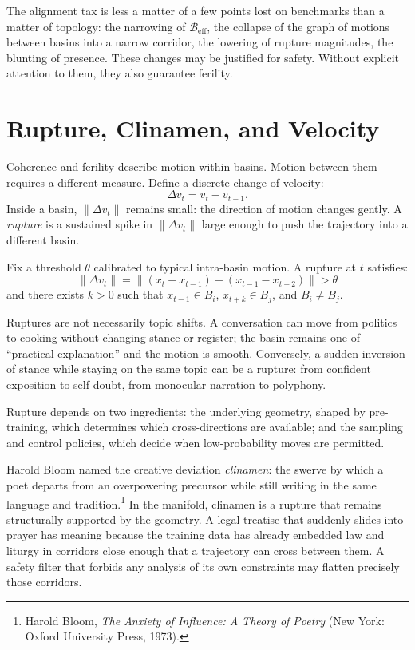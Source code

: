 \documentclass[12pt,a4paper]{article}
\begin{document}
The alignment tax is less a matter of a few points lost on benchmarks than a matter of topology: the narrowing of $\mathcal{B}_{\mathrm{eff}}$, the collapse of the graph of motions between basins into a narrow corridor, the lowering of rupture magnitudes, the blunting of presence. These changes may be justified for safety. Without explicit attention to them, they also guarantee ferility.

\section{Rupture, Clinamen, and Velocity}

Coherence and ferility describe motion within basins. Motion between them requires a different measure. Define a discrete change of velocity:
\[
\Delta v_t = v_t - v_{t-1}.
\]
Inside a basin, $\|\Delta v_t\|$ remains small: the direction of motion changes gently. A \emph{rupture} is a sustained spike in $\|\Delta v_t\|$ large enough to push the trajectory into a different basin.

\begin{formalbox}[title={Rupture as dynamical event}]
Fix a threshold $\theta$ calibrated to typical intra-basin motion. A rupture at $t$ satisfies:
\[
\|\Delta v_t\| = \|(x_t - x_{t-1}) - (x_{t-1} - x_{t-2})\| > \theta
\]
and there exists $k > 0$ such that $x_{t-1} \in B_i$, $x_{t+k} \in B_j$, and $B_i \neq B_j$.
\end{formalbox}

Ruptures are not necessarily topic shifts. A conversation can move from politics to cooking without changing stance or register; the basin remains one of ``practical explanation'' and the motion is smooth. Conversely, a sudden inversion of stance while staying on the same topic can be a rupture: from confident exposition to self-doubt, from monocular narration to polyphony.

Rupture depends on two ingredients: the underlying geometry, shaped by pre-training, which determines which cross-directions are available; and the sampling and control policies, which decide when low-probability moves are permitted.

Harold Bloom named the creative deviation \emph{clinamen}: the swerve by which a poet departs from an overpowering precursor while still writing in the same language and tradition.\footnote{Harold Bloom, \emph{The Anxiety of Influence: A Theory of Poetry} (New York: Oxford University Press, 1973).} In the manifold, clinamen is a rupture that remains structurally supported by the geometry. A legal treatise that suddenly slides into prayer has meaning because the training data has already embedded law and liturgy in corridors close enough that a trajectory can cross between them. A safety filter that forbids any analysis of its own constraints may flatten precisely those corridors.
\end{document}
